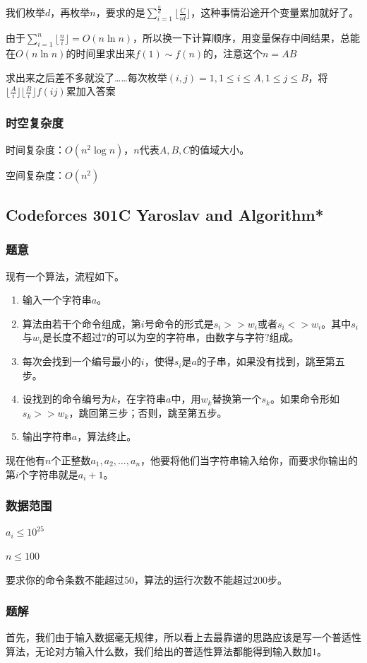 \documentclass{ctexart}
\begin{document}
我们枚举$d$，再枚举$n$，要求的是$\sum\limits_{i=1}^{\frac{n}{d}} \lfloor \frac{C}{id} \rfloor$，这种事情沿途开个变量累加就好了。

由于$\sum\limits_{i=1}^n \lfloor \frac{n}{i} \rfloor =O(n \ln n)$，所以换一下计算顺序，用变量保存中间结果，总能在$O(n \ln n)$的时间里求出来$f(1) \sim f(n)$的，注意这个$n=AB$

求出来之后差不多就没了……每次枚举$(i,j)=1,1 \le i \le A,1 \le j \le B$，将$\lfloor \frac{A}{i} \rfloor \lfloor \frac{B}{i} \rfloor f(ij)$累加入答案
\subsubsection{时空复杂度}
时间复杂度：$O(n^2 \log n)$，$n$代表$A,B,C$的值域大小。

空间复杂度：$O(n^2)$
\subsection{Codeforces 301C Yaroslav and Algorithm*}
\subsubsection{题意}
现有一个算法，流程如下。
\begin{enumerate}
\item 输入一个字符串$a$。
\item 算法由若干个命令组成，第$i$号命令的形式是$s_i>>w_i$或者$s_i<>w_i$。其中$s_i$与$w_i$是长度不超过$7$的可以为空的字符串，由数字与字符$?$组成。
\item 每次会找到一个编号最小的$i$，使得$s_i$是$a$的子串，如果没有找到，跳至第五步。
\item 设找到的命令编号为$k$，在字符串$a$中，用$w_k$替换第一个$s_k$。如果命令形如$s_k>>w_k$，跳回第三步；否则，跳至第五步。
\item 输出字符串$a$，算法终止。
\end{enumerate}

现在他有$n$个正整数$a_1,a_2,\ldots,a_n$，他要将他们当字符串输入给你，而要求你输出的第$i$个字符串就是$a_i+1$。
\subsubsection{数据范围}
$a_i \le 10^{25}$

$n \le 100$

要求你的命令条数不能超过$50$，算法的运行次数不能超过$200$步。
\subsubsection{题解}
首先，我们由于输入数据毫无规律，所以看上去最靠谱的思路应该是写一个普适性算法，无论对方输入什么数，我们给出的普适性算法都能得到输入数加$1$。
\end{document}
